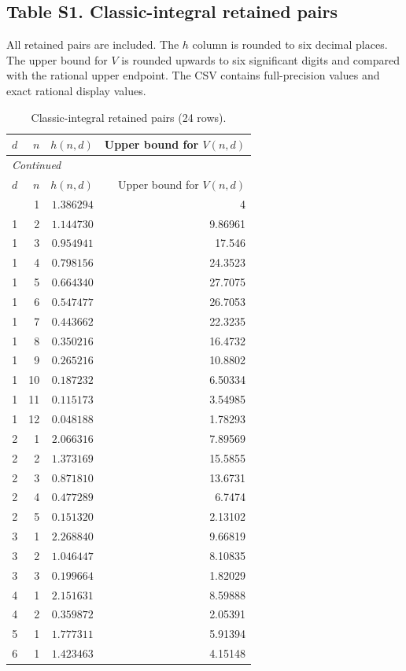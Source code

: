 \documentclass[12pt]{amsart}
\theoremstyle{remark}
\theoremstyle{definition}
\numberwithin{equation}{section}
\begin{document}
\subsection*{Table S1. Classic-integral retained pairs}
All retained pairs are included. The $h$ column is rounded to six decimal
places. The upper bound for $V$ is rounded upwards to six significant digits
and compared with the rational upper endpoint. The CSV contains
full-precision values and exact rational display values.
\begingroup
\small
\begin{longtable}{rrrr}
\caption{Classic-integral retained pairs (24 rows).}\label{tab:s1}\\
\toprule
$d$ & $n$ & $h(n,d)$ & Upper bound for $V(n,d)$ \\
\midrule
\endfirsthead
\multicolumn{4}{l}{\textit{Continued}}\\
\toprule
$d$ & $n$ & $h(n,d)$ & Upper bound for $V(n,d)$ \\
\midrule
\endhead
\midrule
\endfoot
\bottomrule
\endlastfoot
1 & 1 & $1.386294$ & 4 \\
1 & 2 & $1.144730$ & 9.86961 \\
1 & 3 & $0.954941$ & 17.546 \\
1 & 4 & $0.798156$ & 24.3523 \\
1 & 5 & $0.664340$ & 27.7075 \\
1 & 6 & $0.547477$ & 26.7053 \\
1 & 7 & $0.443662$ & 22.3235 \\
1 & 8 & $0.350216$ & 16.4732 \\
1 & 9 & $0.265216$ & 10.8802 \\
1 & 10 & $0.187232$ & 6.50334 \\
1 & 11 & $0.115173$ & 3.54985 \\
1 & 12 & $0.048188$ & 1.78293 \\
2 & 1 & $2.066316$ & 7.89569 \\
2 & 2 & $1.373169$ & 15.5855 \\
2 & 3 & $0.871810$ & 13.6731 \\
2 & 4 & $0.477289$ & 6.7474 \\
2 & 5 & $0.151320$ & 2.13102 \\
3 & 1 & $2.268840$ & 9.66819 \\
3 & 2 & $1.046447$ & 8.10835 \\
3 & 3 & $0.199664$ & 1.82029 \\
4 & 1 & $2.151631$ & 8.59888 \\
4 & 2 & $0.359872$ & 2.05391 \\
5 & 1 & $1.777311$ & 5.91394 \\
6 & 1 & $1.423463$ & 4.15148 \\
\end{longtable}
\endgroup
\end{document}
